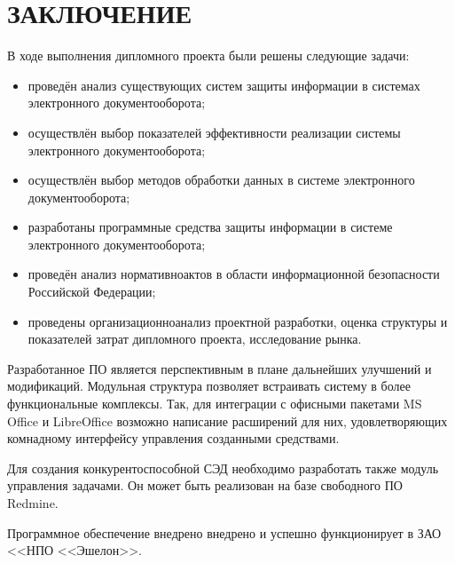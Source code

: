 \chapter*{ЗАКЛЮЧЕНИЕ}						%

В ходе выполнения дипломного проекта были решены следующие задачи:
\begin{itemize}
	\item проведён анализ существующих систем защиты информации в системах электронного документооборота;
	\item осуществлён выбор показателей эффективности реализации системы электронного документооборота;
	\item осуществлён выбор методов обработки данных в системе электронного документооборота;
	\item разработаны программные средства защиты информации в системе электронного документооборота;
	\item проведён анализ нормативно актов в области информационной безопасности Российской Федерации;
	\item проведены организационно анализ проектной разработки, оценка структуры и показателей затрат дипломного проекта, исследование рынка.
\end{itemize}

\vspace{\baselineskip}
Разработанное ПО является перспективным в плане дальнейших улучшений и модификаций. Модульная структура позволяет встраивать систему в более функциональные комплексы. Так, для интеграции с офисными пакетами MS Office и LibreOffice возможно написание расширений для них, удовлетворяющих комнадному интерфейсу управления созданными средствами.

Для создания конкурентоспособной СЭД необходимо разработать также модуль управления задачами. Он может быть реализован на базе свободного ПО Redmine.

\vspace{\baselineskip}
Программное обеспечение внедрено внедрено и успешно функционирует в ЗАО <<НПО <<Эшелон>>.

\clearpage